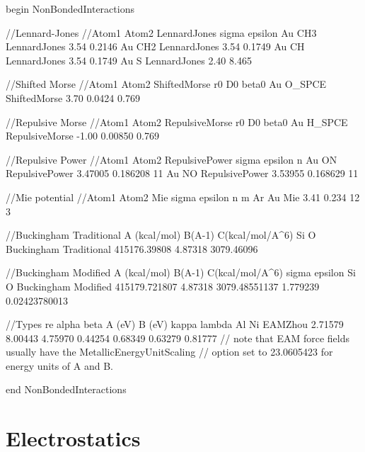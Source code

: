 \documentclass[letterpaper]{report}
\begin{document}
\begin{code}[caption={[An example of a NonBondedInteractions block.] A
simple example of a NonBondedInteractions block. Distances ($\sigma,
r_0$) are given in \AA, while energies ($\epsilon, D0$) are in
kcal/mol.  The Morse potentials have an additional parameter $\beta_0$
which is in units of \AA$^{-1}$.},
label={sch:NonBondedInteractionTypes}]
begin NonBondedInteractions

//Lennard-Jones
//Atom1 Atom2   LennardJones    sigma  epsilon
Au      CH3     LennardJones    3.54   0.2146
Au      CH2     LennardJones    3.54   0.1749 
Au      CH      LennardJones    3.54   0.1749 
Au      S       LennardJones    2.40   8.465

//Shifted Morse
//Atom1 Atom2   ShiftedMorse    r0     D0       beta0
Au      O_SPCE  ShiftedMorse    3.70   0.0424   0.769

//Repulsive Morse
//Atom1 Atom2   RepulsiveMorse  r0     D0       beta0
Au      H_SPCE  RepulsiveMorse  -1.00  0.00850  0.769

//Repulsive Power
//Atom1 Atom2   RepulsivePower   sigma    epsilon    n
Au      ON      RepulsivePower   3.47005  0.186208   11
Au      NO      RepulsivePower   3.53955  0.168629   11

//Mie potential
//Atom1 Atom2   Mie              sigma   epsilon  n  m
Ar      Au      Mie              3.41    0.234   12  3

//Buckingham Traditional      A (kcal/mol)  B(A-1)   C(kcal/mol/A^6)
Si O Buckingham Traditional   415176.39808  4.87318  3079.46096

//Buckingham Modified    A (kcal/mol)  B(A-1)  C(kcal/mol/A^6) sigma    epsilon
Si O Buckingham Modified 415179.721807 4.87318 3079.48551137   1.779239 0.02423780013

//Types       re        alpha   beta    A (eV)  B (eV)  kappa   lambda
Al Ni EAMZhou 2.71579   8.00443 4.75970 0.44254 0.68349 0.63279 0.81777
// note that EAM force fields usually have the MetallicEnergyUnitScaling 
// option set to 23.0605423 for energy units of A and B.

end NonBondedInteractions
\end{code}

\section{\label{section:electrostatics}Electrostatics}
\end{document}
